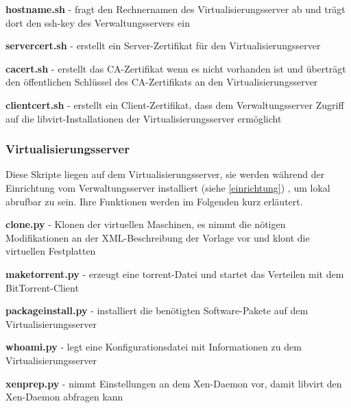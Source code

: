 \textbf{hostname.sh} 
- fragt den Rechnernamen des Virtualisierungsserver ab und trägt dort den ssh-key des Verwaltungsservers ein 

\textbf{servercert.sh}
- erstellt ein Server-Zertifikat für den Virtualisierungsserver

\textbf{cacert.sh}
- erstellt das CA-Zertifikat wenn es nicht vorhanden ist und überträgt den öffentlichen Schlüssel des CA-Zertifikats an den Virtualisierungsserver 

\textbf{clientcert.sh}
- erstellt ein Client-Zertifikat, dass dem Verwaltungsserver Zugriff auf die libvirt-Installationen der Virtualisierungsserver ermöglicht

\subsubsection{Virtualisierungsserver}
Diese Skripte liegen auf dem Virtualisierungsserver, sie werden während der Einrichtung vom Verwaltungsserver installiert (siehe \ref{einrichtung}) , um lokal abrufbar zu sein. Ihre Funktionen werden im Folgenden kurz erläutert.

\textbf{clone.py}
- Klonen der virtuellen Maschinen, es nimmt die nötigen Modifikationen an der XML-Beschreibung der Vorlage vor und klont die virtuellen Festplatten

\textbf{maketorrent.py}
- erzeugt eine torrent-Datei und startet das Verteilen mit dem BitTorrent-Client

\textbf{packageinstall.py}
- installiert die benötigten Software-Pakete auf dem Virtualisierungsserver

\textbf{whoami.py}
- legt eine Konfigurationsdatei mit Informationen zu dem Virtualisierungsserver

\textbf{xenprep.py}
- nimmt Einstellungen an dem Xen-Daemon vor, damit libvirt den Xen-Daemon abfragen kann 

